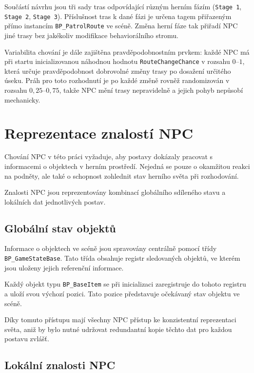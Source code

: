 Součástí návrhu jsou tři sady tras odpovídající různým herním fázím (\texttt{Stage 1}, \texttt{Stage 2}, \texttt{Stage 3}). 
Příslušnost tras k dané fázi je určena tagem přiřazeným přímo instancím \texttt{BP\_PatrolRoute} ve scéně. 
Změna herní fáze tak přiřadí NPC jiné trasy bez jakékoliv modifikace behaviorálního stromu.

Variabilita chování je dále zajištěna pravděpodobnostním prvkem: každé NPC má při startu inicializovanou náhodnou hodnotu \texttt{RouteChangeChance} 
v rozsahu $0$--$1$, která určuje pravděpodobnost dobrovolné změny trasy po dosažení určitého úseku. 
Práh pro toto rozhodnutí je po každé změně rovněž randomizován v rozsahu $0{,}25$--$0{,}75$, takže NPC mění trasy nepravidelně a jejich pohyb nepůsobí mechanicky.

\section{Reprezentace znalostí NPC}

Chování NPC v této práci vyžaduje, aby postavy dokázaly pracovat s informacemi o objektech v herním prostředí. 
Nejedná se pouze o okamžitou reakci na podněty, ale také o schopnost zohlednit stav herního světa při rozhodování.

Znalosti NPC jsou reprezentovány kombinací globálního sdíleného stavu a lokálních dat jednotlivých postav.

\subsection{Globální stav objektů}

Informace o objektech ve scéně jsou spravovány centrálně pomocí třídy \texttt{BP\_GameStateBase}. 
Tato třída obsahuje registr sledovaných objektů, ve kterém jsou uloženy jejich referenční informace.

Každý objekt typu \texttt{BP\_BaseItem} se při inicializaci zaregistruje do tohoto registru a uloží svou výchozí pozici. 
Tato pozice představuje očekávaný stav objektu ve scéně.

Díky tomuto přístupu mají všechny NPC přístup ke konzistentní reprezentaci světa, aniž by bylo nutné 
udržovat redundantní kopie těchto dat pro každou postavu zvlášť.

\subsection{Lokální znalosti NPC}

